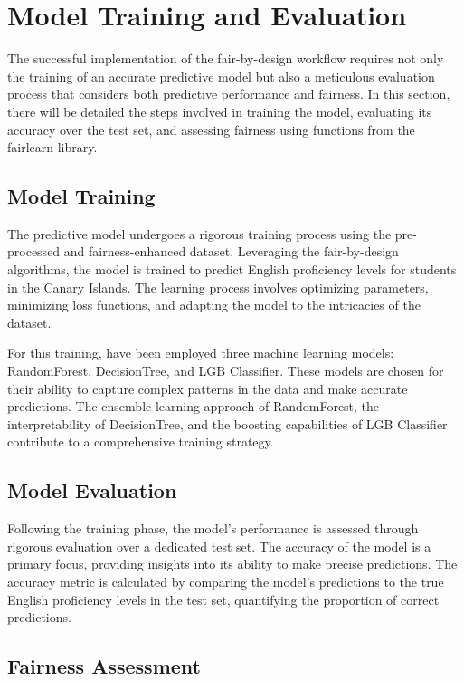 \documentclass[12pt,a4paper,openright,twoside]{book}
\begin{document}
\section{Model Training and Evaluation}

The successful implementation of the fair-by-design workflow requires not only the training of an accurate predictive model but also a meticulous evaluation process that considers both predictive performance and fairness. In this section, there will be detailed the steps involved in training the model, evaluating its accuracy over the test set, and assessing fairness using functions from the fairlearn library.

\subsection{Model Training}

The predictive model undergoes a rigorous training process using the pre-processed and fairness-enhanced dataset. Leveraging the fair-by-design algorithms, the model is trained to predict English proficiency levels for students in the Canary Islands. The learning process involves optimizing parameters, minimizing loss functions, and adapting the model to the intricacies of the dataset.

For this training, have been employed three machine learning models: RandomForest, DecisionTree, and LGB Classifier. These models are chosen for their ability to capture complex patterns in the data and make accurate predictions. The ensemble learning approach of RandomForest, the interpretability of DecisionTree, and the boosting capabilities of LGB Classifier contribute to a comprehensive training strategy.

\subsection{Model Evaluation}

Following the training phase, the model's performance is assessed through rigorous evaluation over a dedicated test set. The accuracy of the model is a primary focus, providing insights into its ability to make precise predictions. The accuracy metric is calculated by comparing the model's predictions to the true English proficiency levels in the test set, quantifying the proportion of correct predictions.

\subsection{Fairness Assessment}
\end{document}
